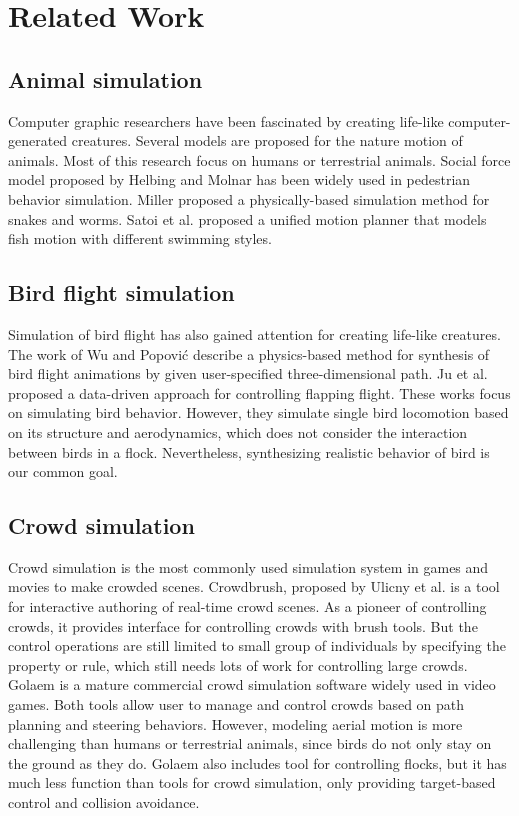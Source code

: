 \chapter{Related Work}

\section{Animal simulation}

Computer graphic researchers have been fascinated by creating life-like computer-generated creatures. Several models are proposed for the nature motion of animals. Most of this research focus on humans or terrestrial animals. Social force model proposed by Helbing and Molnar \cite{Social} has been widely used in pedestrian behavior simulation. Miller \cite{Snake} proposed a physically-based simulation method for snakes and worms. Satoi et al. proposed a unified motion planner \cite{Fish} that models fish motion with different swimming styles.

\section{Bird flight simulation}

Simulation of bird flight has also gained attention for creating life-like creatures. The work of Wu and Popović \cite{Flight} describe a physics-based method for synthesis of bird flight animations by given user-specified three-dimensional path. Ju et al. \cite{Flappy} proposed a data-driven approach for controlling flapping flight. These works focus on simulating bird behavior. However, they simulate single bird locomotion based on its structure and aerodynamics, which does not consider the interaction between birds in a flock. Nevertheless, synthesizing realistic behavior of bird is our common goal. 

\section{Crowd simulation}

Crowd simulation is the most commonly used simulation system in games and movies to make crowded scenes. Crowdbrush, proposed by Ulicny et al. \cite{Brush} is a tool for interactive authoring of real-time crowd scenes. As a pioneer of controlling crowds, it provides interface for controlling crowds with brush tools. But the control operations are still limited to small group of individuals by specifying the property or rule, which still needs lots of work for controlling large crowds. Golaem \cite{Golaem} is a mature commercial crowd simulation software widely used in video games. Both tools allow user to manage and control crowds based on path planning and steering behaviors. However, modeling aerial motion is more challenging than humans or terrestrial animals, since birds do not only stay on the ground as they do. Golaem also includes tool for controlling flocks, but it has much less function than tools for crowd simulation, only providing target-based control and collision avoidance.

